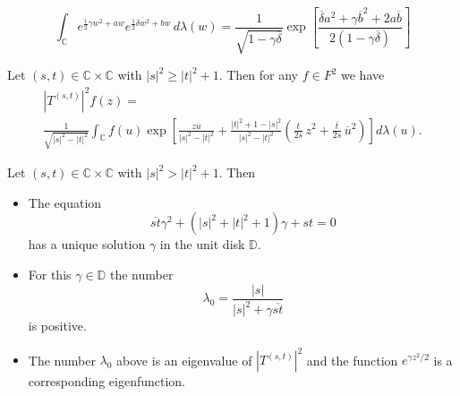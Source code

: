 \documentclass[10pt,a4paper]{amsart}
\newcommand{\C}{{\mathbb C}}
\newcommand{\D}{{\mathbb D}}
\newcommand{\inc}{\int_{\C}}
\begin{document}
\begin{equation}\label{eqIC}
\inc e^{\frac{1}{2}\gamma w^{2}+aw}e^{\frac{1}{2}\overline{\delta w^2}
+\overline{bw}}\,d\lambda(w)
=\frac{1}{\sqrt{1-\gamma\overline{\delta}}}
\exp\left[\frac{\overline{\delta}a^{2}+\gamma \overline{b}^{2}
+2a\overline{b}}{2(1-\gamma\overline{\delta})}\right]
\end{equation}

\begin{lemma}\label{lemma|T|}
Let $(s, t)\in\C\times\C$ with $|s|^2\ge|t|^2+1$. Then for any
$f\in F^{2}$ we have
\begin{multline*}
\left|T^{(s,t)}\right|^2f(z)=\\
\frac{1}{\sqrt{|s|^2-|t|^2}}\inc f(u)\exp\left[\frac{ z\overline{u}}
{{|s|^2-|t|^2}}+\frac{|t|^2+1-|s|^2}{|s|^2-|t|^2}
\left(\frac{t}{2\overline{s}}\,z^2+\frac{\bar t}{2s}
\,\overline u^2\right)\right] d\lambda(u).
\end{multline*}
\end{lemma}

\begin{lemma}\label{existenceofgamma}
Let $(s, t)\in\C\times\C$ with $|s|^2>|t|^2+1$. Then
\begin{itemize}
\item[(a)] The equation
\begin{equation}\label{choiceofgamma}
\overline{s t}\gamma^2+(|s|^2+|t|^2+1)\gamma+st=0
\end{equation}
has a unique solution $\gamma$ in the unit disk $\D$.
\item[(b)] For this $\gamma\in\D$ the number
$$\lambda_0=\frac{|s|}{|s|^2+\gamma\overline{st} }$$
is positive.
\item[(c)] The number $\lambda_0$ above is an eigenvalue of
$\left|T^{(s,t)}\right|^2$ and the function $e^{\gamma z^2/2}$ is
a corresponding eigenfunction.
\end{itemize}
\end{lemma}
\end{document}
